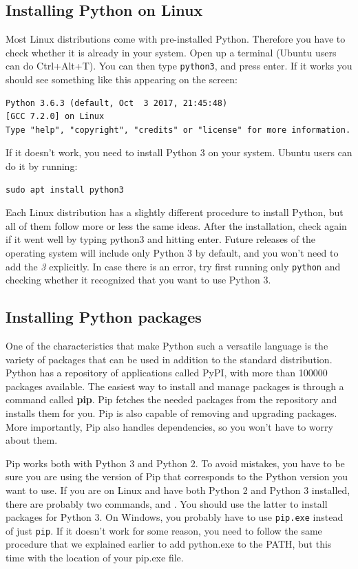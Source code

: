 \subsection{Installing Python on Linux}\label{subsec:installation-on-linux}
Most Linux distributions come with pre-installed Python. Therefore you have to check whether it is already in your system. Open up a terminal (Ubuntu users can do Ctrl+Alt+T). You can then type \texttt{python3}, and press enter. If it works you should see something like this appearing on the screen:

\begin{verbatim}
Python 3.6.3 (default, Oct  3 2017, 21:45:48)
[GCC 7.2.0] on Linux
Type "help", "copyright", "credits" or "license" for more information.
\end{verbatim}

If it doesn't work, you need to install Python 3 on your system. Ubuntu users can do it by running:
\begin{verbatim}
sudo apt install python3
\end{verbatim}

Each Linux distribution has a slightly different procedure to install Python, but all of them follow more or less the same ideas. After the installation, check again if it went well by typing python3 and hitting enter. Future releases of the operating system will include only Python 3 by default, and you won't need to add the \emph{3} explicitly. In case there is an error, try first running only \texttt{python} and checking whether it recognized that you want to use Python 3.

\subsection{Installing Python packages}\label{subsec:installing-python-packages2}\label{subsec:installing-python-packages}
One of the characteristics that make Python such a versatile language is the variety of packages that can be used in addition to the standard distribution. Python has a repository of applications called PyPI, with more than 100000 packages available. The easiest way to install and manage packages is through a command called \textbf{pip}. Pip fetches the needed packages from the repository and installs them for you. Pip is also capable of removing and upgrading packages. More importantly, Pip also handles dependencies, so you won't have to worry about them.

Pip works both with Python 3 and Python 2. To avoid mistakes, you have to be sure you are using the version of Pip that corresponds to the Python version you want to use. If you are on Linux and have both Python 2 and Python 3 installed, there are probably two commands,  and . You should use the latter to install packages for Python 3. On Windows, you probably have to use \texttt{pip.exe} instead of just \texttt{pip}. If it doesn't work for some reason, you need to follow the same procedure that we explained earlier to add python.exe to the PATH, but this time with the location of your pip.exe file.

